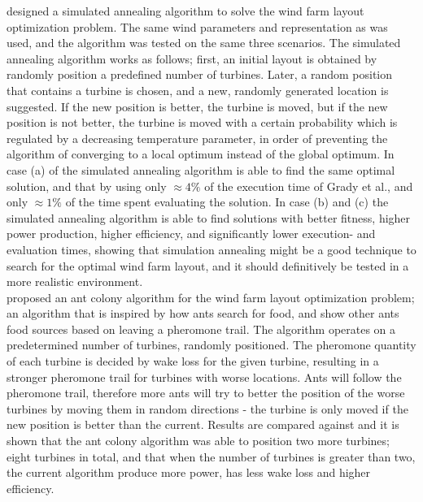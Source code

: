 \noindent \cite{Bilbao} designed a simulated annealing algorithm to solve the wind farm layout optimization problem. The same wind parameters and representation as \cite{Grady} was used, and the algorithm was tested on the same three scenarios. The simulated annealing algorithm works as follows; first, an initial layout is obtained by randomly position a predefined number of turbines. Later, a random position that contains a turbine is chosen, and a new, randomly generated location is suggested. If the new position is better, the turbine is moved, but if the new position is not better, the turbine is moved with a certain probability which is regulated by a decreasing temperature parameter, in order of preventing the algorithm of converging to a local optimum instead of the global optimum. In case (a) of \citep{Grady} the simulated annealing algorithm is able to find the same optimal solution, and that by using only $\approx 4\%$ of the execution time of Grady et al., and only $\approx 1\%$ of the time spent evaluating the solution. In case (b) and (c) the simulated annealing algorithm is able to find solutions with better fitness, higher power production, higher efficiency, and significantly lower execution- and evaluation times, showing that simulation annealing might be a good technique to search for the optimal wind farm layout, and it should definitively be tested in a more realistic environment. \\ 


\noindent \cite{Eroglu} proposed an ant colony algorithm for the wind farm layout optimization problem; an algorithm that is inspired by how ants search for food, and show other ants food sources based on leaving a pheromone trail. The algorithm operates on a predetermined number of turbines, randomly positioned. The pheromone quantity of each turbine is decided by wake loss for the given turbine, resulting in a stronger pheromone trail for turbines with worse locations. Ants will follow the pheromone trail, therefore more ants will try to better the position of the worse turbines by moving them in random directions - the turbine is only moved if the new position is better than the current. Results are compared against \citep{Kusiak} and it is shown that the ant colony algorithm was able to position two more turbines; eight turbines in total, and that when the number of turbines is greater than two, the current algorithm produce more power, has less wake loss and higher efficiency.\\


